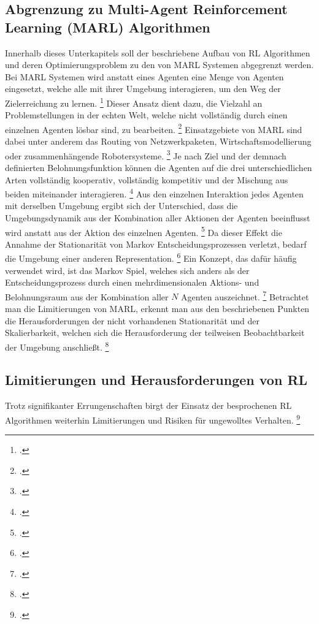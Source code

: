 \subsection{Abgrenzung zu Multi-Agent Reinforcement Learning (MARL) Algorithmen}
Innerhalb dieses Unterkapitels soll der beschriebene Aufbau von RL Algorithmen und deren Optimierungsproblem zu den von MARL Systemen abgegrenzt werden.
Bei MARL Systemen wird anstatt eines Agenten eine Menge von Agenten eingesetzt, welche alle mit ihrer Umgebung interagieren, um den Weg der Zielerreichung zu lernen. \footcite[Vgl.][S. 6]{Wong.2022}
Dieser Ansatz dient dazu, die Vielzahl an Problemstellungen in der echten Welt, welche nicht vollständig durch einen einzelnen Agenten lösbar sind, zu bearbeiten. \footcite[Vgl.][S. 1]{Canese.2021}
Einsatzgebiete von MARL sind dabei unter anderem das Routing von Netzwerkpaketen, Wirtschaftsmodellierung oder zusammenhängende Robotersysteme. \footcite[Vgl.][S. 1]{Canese.2021}
Je nach Ziel und der demnach definierten Belohnungsfunktion können die Agenten auf die drei unterschiedlichen Arten vollständig kooperativ, vollständig kompetitiv und der Mischung aus beiden miteinander interagieren. \footcite[Vgl.][S. 8f.]{Canese.2021}
Aus den einzelnen Interaktion jedes Agenten mit derselben Umgebung ergibt sich der Unterschied, dass die Umgebungsdynamik aus der Kombination aller Aktionen der Agenten beeinflusst wird anstatt aus der Aktion des einzelnen Agenten. \footcite[Vgl.][S. 2]{Wong.2022}
Da dieser Effekt die Annahme der Stationarität von Markov Entscheidungsprozessen verletzt, bedarf die Umgebung einer anderen Representation. \footcite[Vgl.][S. 6]{Wong.2022}
Ein Konzept, das dafür häufig verwendet wird, ist das Markov Spiel, welches sich anders als der Entscheidungsprozess durch einen mehrdimensionalen Aktions- und Belohnungsraum aus der Kombination aller $N$ Agenten auszeichnet. \footcite[Vgl.][S. 4]{Canese.2021}
Betrachtet man die Limitierungen von MARL, erkennt man aus den beschriebenen Punkten die Herausforderungen der nicht vorhandenen Stationarität und der Skalierbarkeit, welchen sich die Herausforderung der teilweisen Beobachtbarkeit der Umgebung anschließt. \footcite[Vgl.][S. 9ff.]{Canese.2021}

\subsection{Limitierungen und Herausforderungen von RL}
Trotz signifikanter Errungenschaften birgt der Einsatz der besprochenen RL Algorithmen weiterhin Limitierungen und Risiken für ungewolltes Verhalten. \footcite[Vgl.][S. 7]{Li.2019}

